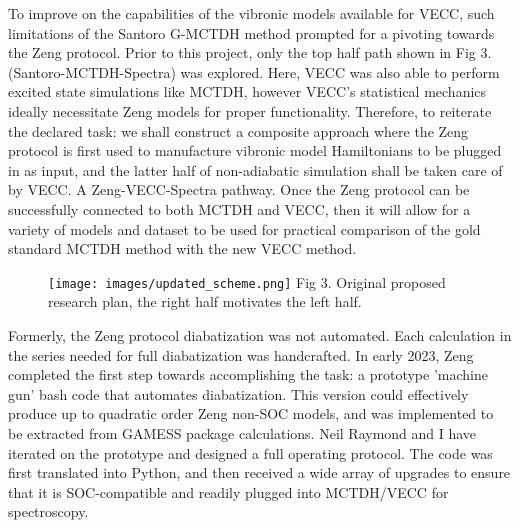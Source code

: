 To improve on the capabilities of the vibronic models available for VECC, such limitations of the Santoro G-MCTDH method prompted for a pivoting towards the Zeng protocol. Prior to this project, only the top half path shown in Fig 3. (Santoro-MCTDH-Spectra) was explored. Here, VECC was also able to perform excited state simulations like MCTDH, however VECC's statistical mechanics ideally necessitate Zeng models for proper functionality. Therefore, to reiterate the declared task: we shall construct a composite approach where the Zeng protocol is first used to manufacture vibronic model Hamiltonians to be plugged in as input, and the latter half of non-adiabatic simulation shall be taken care of by VECC. A Zeng-VECC-Spectra pathway. Once the Zeng protocol can be successfully connected to both MCTDH and VECC, then it will allow for a variety of models and dataset to be used for practical comparison of the gold standard MCTDH method with the new VECC method.

\begin{figure}[!ht]
    \texttt{[image: images/updated\_scheme.png]}
    \center
    \small{Fig 3. Original proposed research plan, the right half motivates the left half.}
\end{figure}

Formerly, the Zeng protocol diabatization was not automated. Each calculation in the series needed for full diabatization was handcrafted. In early 2023, Zeng completed the first step towards accomplishing the task: a prototype 'machine gun' bash code that automates diabatization. This version could effectively produce up to quadratic order Zeng non-SOC models, and was implemented to be extracted from GAMESS package calculations. Neil Raymond and I have iterated on the prototype and designed a full operating protocol. The code was first translated into Python, and then received a wide array of upgrades to ensure that it is SOC-compatible and readily plugged into MCTDH/VECC for spectroscopy.


\cleardoublepage




